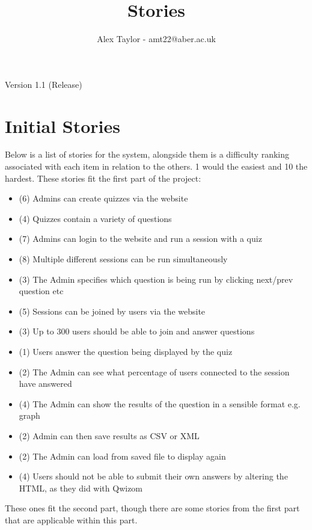 \documentclass{article}
\title{Stories}
\author{Alex Taylor - amt22@aber.ac.uk}
\begin{document}
\maketitle
\begin{center}
	Version 1.1 (Release)
\end{center}
\thispagestyle{empty}

\section{Initial Stories}
Below is a list of stories for the system, alongside them is a difficulty ranking associated with each item in relation to the others. 1 would the easiest and 10 the hardest.
These stories fit the first part of the project:
\begin{itemize}
	\item (6) Admins can create quizzes via the website
	\item (4) Quizzes contain a variety of questions
	\item (7) Admins can login to the website and run a session with a quiz
	\item (8) Multiple different sessions can be run simultaneously
	\item (3) The Admin specifies which question is being run by clicking next/prev question etc
	\item (5) Sessions can be joined by users via the website
	\item (3) Up to 300 users should be able to join and answer questions
	\item (1) Users answer the question being displayed by the quiz
	\item (2) The Admin can see what percentage of users connected to the session have answered
	\item (4) The Admin can show the results of the question in a sensible format e.g. graph
	\item (2) Admin can then save results as CSV or XML
	\item (2) The Admin can load from saved file to display again
	\item (4) Users should not be able to submit their own answers by altering the HTML, as they did with Qwizom
\end{itemize}
These ones fit the second part, though there are some stories from the first part that are applicable within this part.
\end{document}
